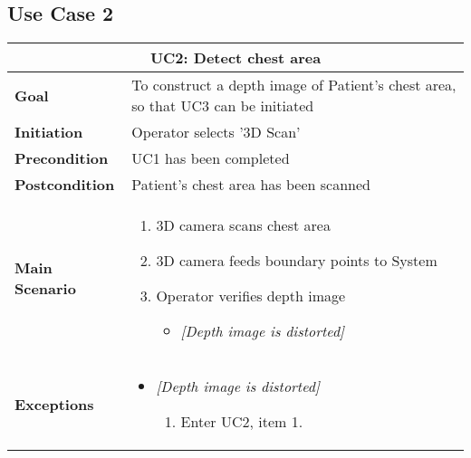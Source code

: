 \subsection{Use Case 2}
\begin{tabular}{ | l | p{} | }
  \hline
  \multicolumn{2}{|c|}{\textbf{UC2: Detect chest area}} \\ \hline
  \textbf{Goal} & To construct a depth image of Patient’s chest area, so that UC3 can be initiated  \\ \hline
  \textbf{Initiation} & Operator selects ’3D Scan’  \\ \hline
  \textbf{Precondition} & UC1 has been completed  \\ \hline
  \textbf{Postcondition} & Patient’s chest area has been scanned \\ \hline
  \textbf{Main Scenario} & 
  	{\begin{enumerate} 
  	\item 3D camera scans chest area
  	\item 3D camera feeds boundary points to System
  	\item Operator verifies depth image
  		\begin{itemize}
  		\item \textit{[Depth image is distorted]}
  		\end{itemize}
  	\end{enumerate}} \\ \hline
  \textbf{Exceptions} & 
  	{\begin{itemize} 
  	\item \textit{[Depth image is distorted]}
  		\begin{enumerate}
  		\item Enter UC2, item 1.
  		\end{enumerate}
  	\end{itemize}} \\ \hline
\end{tabular}

